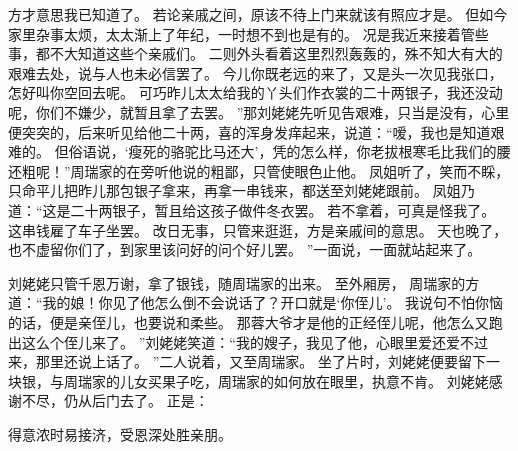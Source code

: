 方才意思我已知道了。
若论亲戚之间，原该不待上门来就该有照应才是。
但如今家里杂事太烦，太太渐上了年纪，一时想不到也是有的。
况是我近来接着管些事，都不大知道这些个亲戚们。
二则外头看着这里烈烈轰轰的，殊不知大有大的艰难去处，说与人也未必信罢了。
今儿你既老远的来了，又是头一次见我张口，怎好叫你空回去呢。
可巧昨儿太太给我的丫头们作衣裳的二十两银子，我还没动呢，你们不嫌少，就暂且拿了去罢。
”那刘姥姥先听见告艰难，只当是没有，心里便突突的，后来听见给他二十两，喜的浑身发痒起来，说道：“嗳，我也是知道艰难的。
但俗语说，‘瘦死的骆驼比马还大’，凭的怎么样，你老拔根寒毛比我们的腰还粗呢！”周瑞家的在旁听他说的粗鄙，只管使眼色止他。
凤姐听了，笑而不睬，只命平儿把昨儿那包银子拿来，再拿一串钱来，都送至刘姥姥跟前。
凤姐乃道：“这是二十两银子，暂且给这孩子做件冬衣罢。
若不拿着，可真是怪我了。
这串钱雇了车子坐罢。
改日无事，只管来逛逛，方是亲戚间的意思。
天也晚了，也不虚留你们了，到家里该问好的问个好儿罢。
”一面说，一面就站起来了。
\par
刘姥姥只管千恩万谢，拿了银钱，随周瑞家的出来。
至外厢房，
周瑞家的方道：“我的娘！你见了他怎么倒不会说话了？开口就是‘你侄儿’。
我说句不怕你恼的话，便是亲侄儿，也要说和柔些。
那蓉大爷才是他的正经侄儿呢，他怎么又跑出这么个侄儿来了。
”刘姥姥笑道：“我的嫂子，我见了他，心眼里爱还爱不过来，那里还说上话了。
”二人说着，又至周瑞家。
坐了片时，刘姥姥便要留下一块银，与周瑞家的儿女买果子吃，周瑞家的如何放在眼里，执意不肯。
刘姥姥感谢不尽，仍从后门去了。
正是：\par
得意浓时易接济，受恩深处胜亲朋。
\par
{}\par
{}
